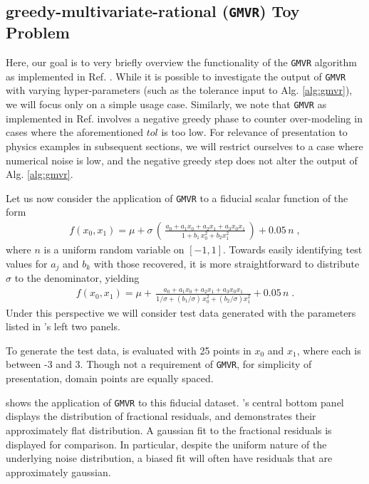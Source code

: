\documentclass[twocolumn,aps,prd,floatfix,preprintnumbers,a4paper,nofootinbib,
superscriptaddress,10pt]{revtex4-1}
\def\gmvr#1{greedy-multivariate-rational#1
  (\texttt{GMVR}#1)\gdef\gmvr{\texttt{GMVR}}}
\begin{document}
\subsection{\gmvr{} Toy Problem}
%
Here, our goal is to very briefly overview the functionality of the \gmvr{} algorithm as implemented in Ref. \cite{lionel_london_2018_1402516}.
%
While it is possible to investigate the output of \gmvr{} with varying hyper-parameters (such as the tolerance input to Alg. \ref{alg:gmvr}), we will focus only on a simple usage case.
%
Similarly, we note that \gmvr{} as implemented in Ref. \cite{lionel_london_2018_1402516} involves a negative greedy phase to counter over-modeling in cases where the aforementioned $tol$ is too low.
%
For relevance of presentation to physics examples in subsequent sections, we will restrict ourselves to a case where numerical noise is low, and the negative greedy step does not alter the output of Alg. \ref{alg:gmvr}.
%
%
\par Let us now consider the application of \gmvr{} to a fiducial scalar function of the form
%
\begin{align}
  f(x_0,x_1) = \mu + \sigma \, \left( \, \frac{a_0 +a_1  x_0 + a_2 x_1 + a_3 x_0 x_1}{ 1 + b_1 \, x_0^2 +  b_2 x_1^2 } \, \right) + 0.05 \, n \; ,
\end{align}
%
where $n$ is a uniform random variable on $[-1,1]$.
%
Towards easily identifying test values for $a_j$ and $b_k$ with those recovered, it is more straightforward to distribute $\sigma$ to the denominator, yielding
%
\begin{align}
  \label{eq:gmvrtoy1}
  f(x_0,x_1) = \mu + \, \frac{a_0 +a_1  x_0 + a_2 x_1 + a_3 x_0 x_1}{ 1/\sigma + (b_1/\sigma) \, x_0^2 +  (b_2/\sigma) x_1^2 } + 0.05 \, n \; .
\end{align}
%
Under this perspective we will consider test data generated with the parameters listed in 's left two panels.
%
\par To generate the test data,  is evaluated with 25 points in $x_0$ and $x_1$, where each is between -3 and 3. Though not a requirement of \gmvr{}, for simplicity of presentation, domain points are equally spaced.
%
\par {} shows the application of \gmvr{} to this fiducial dataset.
%
's central bottom panel displays the distribution of fractional residuals, and demonstrates their approximately flat distribution.
%
A gaussian fit to the fractional residuals is displayed for comparison.
%
In particular, despite the uniform nature of the underlying noise distribution, a biased fit will often have residuals that are approximately gaussian.
\end{document}
